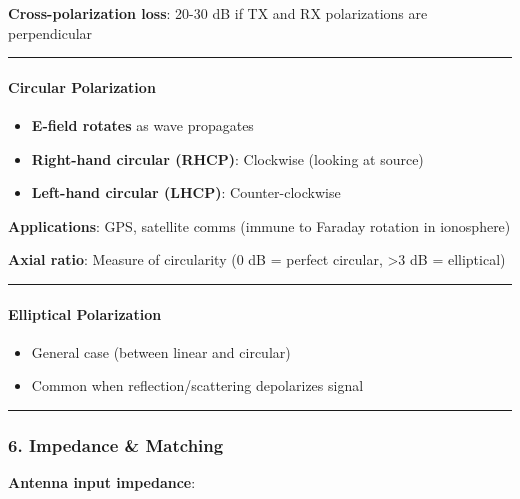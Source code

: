 \textbf{Cross-polarization loss}: 20-30 dB if TX and RX polarizations
are perpendicular

\begin{center}\rule{0.5\linewidth}{0.5pt}\end{center}

\paragraph{Circular Polarization}\label{circular-polarization}

\begin{itemize}
\tightlist
\item
  \textbf{E-field rotates} as wave propagates
\item
  \textbf{Right-hand circular (RHCP)}: Clockwise (looking at source)
\item
  \textbf{Left-hand circular (LHCP)}: Counter-clockwise
\end{itemize}

\textbf{Applications}: GPS, satellite comms (immune to Faraday rotation
in ionosphere)

\textbf{Axial ratio}: Measure of circularity (0 dB = perfect circular,
\textgreater3 dB = elliptical)

\begin{center}\rule{0.5\linewidth}{0.5pt}\end{center}

\paragraph{Elliptical Polarization}\label{elliptical-polarization}

\begin{itemize}
\tightlist
\item
  General case (between linear and circular)
\item
  Common when reflection/scattering depolarizes signal
\end{itemize}

\begin{center}\rule{0.5\linewidth}{0.5pt}\end{center}

\subsubsection{6. Impedance \& Matching}\label{impedance-matching}

\textbf{Antenna input impedance}:

